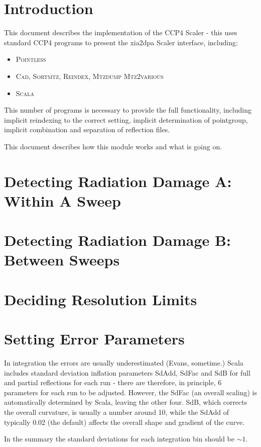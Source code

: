 \documentclass[a4paper, 11pt]{article}
\begin{document}
\section{Introduction}

This document describes the implementation of the CCP4 Scaler - this uses 
standard CCP4 programs to present the xia2dpa Scaler interface, including:

\begin{itemize}
\item{\textsc{Pointless}}
\item{\textsc{Cad}, \textsc{Sortmtz}, \textsc{Reindex}, \textsc{Mtzdump}
\textsc{Mtz2various}}
\item{\textsc{Scala}}
\end{itemize}

\noindent
This number of programs is necessary to provide the full functionality,
including implicit reindexing to the correct setting, implicit determination
of pointgroup, implicit combination and separation of reflection files.

This document describes how this module works and what is going on.

\section{Detecting Radiation Damage A: Within A Sweep}



\section{Detecting Radiation Damage B: Between Sweeps}



\section{Deciding Resolution Limits}



\section{Setting Error Parameters}

In integration the errors are usually underestimated (Evans, sometime.) 
Scala includes standard deviation inflation parameters SdAdd, SdFac and SdB
for full and partial reflections for each run - there are therefore, in 
principle, 6 parameters for each run to be adjusted. However, the SdFac
(an overall scaling) is automatically determined by Scala, leaving the 
other four. SdB, which corrects the overall curvature, is usually a number
around 10, while the SdAdd of typically 0.02 (the default) affects the 
overall shape and gradient of the curve.

In the summary the standard deviations for each integration bin should 
be $\sim 1$.
\end{document}
